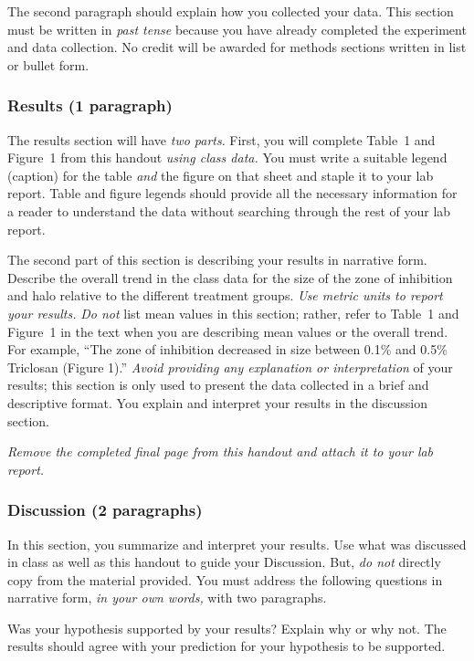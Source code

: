 \documentclass[12pt]{exam}
\begin{document}
The second paragraph should explain how you
collected your data. This section must be written in \emph{past tense} because you have
already completed the experiment and data collection. No credit will be
awarded for methods sections written in list or bullet form.

\subsubsection*{Results (1 paragraph)}

The results section will have \emph{two parts}. First, you will complete
Table~1 and Figure~1 from this handout \emph{using class data.} You must
write a suitable legend (caption) for the table \emph{and} the figure on
that sheet and staple it to your lab report. Table and figure legends
should provide all the necessary information for a reader to understand
the data without searching through the rest of your lab report.

The second part of this section is describing your results in narrative
form. Describe the overall trend in the class data for the size of the zone of inhibition and halo 
relative to the different treatment groups. \emph{Use metric
units to report your results.} \emph{Do not} list mean values in this section; rather, refer to
Table~1 and Figure~1 in the text when you are describing mean values or
the overall trend. For example, ``The zone of inhibition decreased in
size between 0.1\% and 0.5\% Triclosan (Figure 1).'' \emph{Avoid
providing any explanation or interpretation} of your results; this
section is only used to present the data collected in a brief and
descriptive format. You explain and interpret your results in the discussion section.

\emph{Remove the completed final page from this handout and attach it to your lab report.}

\subsubsection*{Discussion (2 paragraphs)} 

In this section, you summarize and interpret your results. Use what
was discussed in class as well as this handout to guide
your Discussion. But, \emph{do not} directly copy from the material provided.
You must address the following questions in narrative form, \emph{in your own words,} with two
paragraphs.

Was your hypothesis supported by your results? Explain why or why not. 
The results should agree with your prediction for your hypothesis to be supported. 
\end{document}
